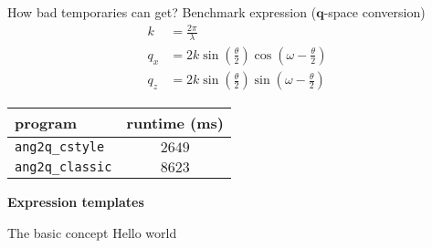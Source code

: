 \documentclass{beamer}
\begin{document}
\begin{frame}[fragile]{How bad temporaries can get?}
    Benchmark expression ($\mathbf{q}$-space conversion)
    \begin{align}
    k &= \frac{2\pi}{\lambda} \nonumber \\
        q_x &= 2k\sin\left(\frac{\theta}{2}\right)\cos\left(\omega-\frac{\theta}{2}\right)
        \nonumber \\
        q_z &= 2k\sin\left(\frac{\theta}{2}\right)\sin\left(\omega-\frac{\theta}{2}\right)
        \nonumber
    \end{align}

    \vspace{0.05\textheight}
    \begin{center}
        \begin{tabular}{lc}
            \hline
            program & runtime (ms) \\
            \hline\hline
            \texttt{ang2q\_cstyle} & $2649$ \\
            \texttt{ang2q\_classic} & $8623$  \\
            \hline
        \end{tabular}
    \end{center}

\end{frame}

\begin{frame}[plain]
    \begin{center}
        \huge\textbf{Expression templates}
    \end{center}
\end{frame}

\begin{frame}[fragile]{The basic concept}
Hello world
\end{frame}
\end{document}
